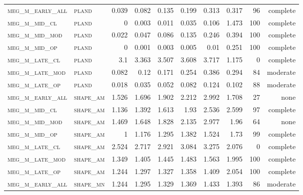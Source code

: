 \begin{landscape}
\begin{center}
\begin{footnotesize}
\begin{longtable}{llrrrrr|rrr}
\textsc{meg\_m\_early\_all} & \textsc{pland     }   & 0.039    & 0.082    & 0.135    & 0.199    & 0.313    & 0.317    & 96  & complete \\
\textsc{meg\_m\_mid\_cl   } & \textsc{pland     }   & 0        & 0.003    & 0.011    & 0.035    & 0.106    & 1.473    & 100 & complete \\
\textsc{meg\_m\_mid\_mod  } & \textsc{pland     }   & 0.022    & 0.047    & 0.086    & 0.135    & 0.246    & 0.394    & 100 & complete \\
\textsc{meg\_m\_mid\_op   } & \textsc{pland     }   & 0        & 0.001    & 0.003    & 0.005    & 0.01     & 0.251    & 100 & complete \\
\textsc{meg\_m\_late\_cl  } & \textsc{pland     }   & 3.1      & 3.363    & 3.507    & 3.608    & 3.717    & 1.175    & 0   & complete \\
\textsc{meg\_m\_late\_mod } & \textsc{pland     }   & 0.082    & 0.12     & 0.171    & 0.254    & 0.386    & 0.294    & 84  & moderate \\
\textsc{meg\_m\_late\_op  } & \textsc{pland     }   & 0.018    & 0.035    & 0.052    & 0.082    & 0.124    & 0.102    & 88  & moderate \\
\textsc{meg\_m\_early\_all} & \textsc{shape\_am }   & 1.526    & 1.696    & 1.902    & 2.212    & 2.992    & 1.708    & 27  & none     \\
\textsc{meg\_m\_mid\_cl   } & \textsc{shape\_am }   & 1.136    & 1.392    & 1.613    & 1.93     & 2.536    & 2.599    & 97  & complete \\
\textsc{meg\_m\_mid\_mod  } & \textsc{shape\_am }   & 1.469    & 1.648    & 1.828    & 2.135    & 2.977    & 1.96     & 64  & none     \\
\textsc{meg\_m\_mid\_op   } & \textsc{shape\_am }   & 1        & 1.176    & 1.295    & 1.382    & 1.524    & 1.73     & 99  & complete \\
\textsc{meg\_m\_late\_cl  } & \textsc{shape\_am }   & 2.524    & 2.717    & 2.921    & 3.084    & 3.275    & 2.076    & 0   & complete \\
\textsc{meg\_m\_late\_mod } & \textsc{shape\_am }   & 1.349    & 1.405    & 1.445    & 1.483    & 1.563    & 1.995    & 100 & complete \\
\textsc{meg\_m\_late\_op  } & \textsc{shape\_am }   & 1.244    & 1.297    & 1.327    & 1.358    & 1.409    & 2.054    & 100 & complete \\
\textsc{meg\_m\_early\_all} & \textsc{shape\_mn }   & 1.244    & 1.295    & 1.329    & 1.369    & 1.433    & 1.393    & 86  & moderate \\

\end{longtable}
\end{footnotesize}
\end{center}
\end{landscape}
